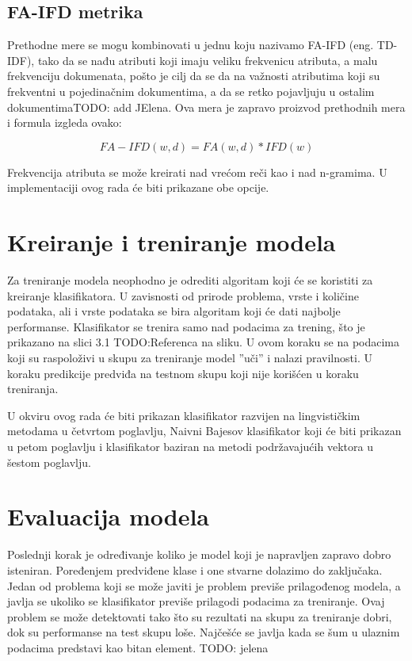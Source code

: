 \documentclass[12pt,oneside]{memoir}
\begin{document}
\subsection{FA-IFD metrika}

Prethodne mere se mogu kombinovati u jednu koju nazivamo FA-IFD (eng.  TD-IDF), tako da se nađu atributi koji imaju veliku frekvenicu atributa,  a malu frekvenciju dokumenata, pošto je cilj da se da na važnosti atributima koji su frekventni u pojedinačnim dokumentima, a da se retko pojavljuju u ostalim dokumentimaTODO: add JElena.  Ova mera je zapravo proizvod prethodnih mera i formula izgleda ovako:

\begin{equation}
	FA-IFD(w, d) = FA(w,d) * IFD(w)
\end{equation}

Frekvencija atributa se može kreirati nad vrećom reči kao i nad n-gramima.  U implementaciji ovog rada će biti prikazane obe opcije.

\section{Kreiranje i treniranje modela}

Za treniranje modela neophodno je odrediti algoritam koji će se koristiti za kreiranje klasifikatora. U zavisnosti od prirode problema, vrste i količine podataka, ali i vrste podataka se bira algoritam koji će dati najbolje performanse. Klasifikator se trenira samo nad podacima za trening, što je prikazano na slici 3.1 TODO:Referenca na sliku. U ovom koraku se na podacima koji su raspoloživi u skupu za treniranje model ”uči” i nalazi pravilnosti. U koraku predikcije predviđa na testnom skupu koji nije korišćen u koraku treniranja.

U okviru ovog rada će biti prikazan klasifikator razvijen na lingvističkim metodama u četvrtom poglavlju, Naivni Bajesov klasifikator koji će biti prikazan u petom poglavlju i klasifikator baziran na metodi podržavajućih vektora u šestom poglavlju.

\section{Evaluacija modela}

Poslednji korak je određivanje koliko je model koji je napravljen zapravo dobro isteniran. Poređenjem predviđene klase i one stvarne dolazimo do zaključaka. Jedan od problema koji se može javiti je problem previše prilagođenog modela, a javlja se ukoliko se klasifikator previše prilagodi podacima za treniranje.  Ovaj problem se može detektovati tako što su rezultati na skupu za treniranje dobri, dok su performanse na test skupu loše.  Najčešće se javlja kada se šum u ulaznim podacima predstavi kao bitan element.  TODO: jelena
\end{document}
